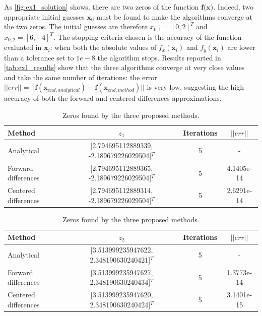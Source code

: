 \documentclass[11pt,a4paper,oneside]{article}
\renewcommand{\vec}[1]{\mathbf{#1}}
\begin{document}
As \autoref{fig:ex1_solution} shows, there are two zeros of the function $\vec{f}$($\vec{x}$). Indeed, two appropriate initial guesses $\vec{x}_0$ must be found to make the algorithms converge at the two zeros. The initial guesses are therefore $x_{0,1}=[0, 2]^T$ and $x_{0,2}=[6, -4]^T$. The stopping criteria chosen is the accuracy of the function evaluated in $\vec{x}_i$: when both the absolute values of $f_x(\vec{x}_i)$ and $f_y(\vec{x}_i)$ are lower than a tolerance set to $1e-8$ the algorithm stops.
Results reported in \autoref{tab:ex1_results} show that the three algorithms converge at very close values and take the same number of iterations: the error $||err||=||\vec{f}(\vec{x}_{end,analytical}) - \vec{f}(\vec{x}_{end,method})||$ is very low, suggesting the high accuracy of both the forward and centered differences approximations.
\begin{table}[ht]
    \centering
    \begin{tabular}{l|c c c}
        \textbf{Method} & \mbox{\boldmath $z_1$} & \textbf{Iterations} &  \mbox{\boldmath $||err||$} \\
        \midrule
        \midrule
        Analytical                  & [2.794695112889339, -2.189679226029504]$^T$  & 5 & -\\
        Forward differences         & [2.794695112889365, -2.189679226029504]$^T$  & 5 & 4.1405e-14\\
        Centered differences        & [2.794695112889314, -2.189679226029504]$^T$  & 5 & 2.6291e-14\\
        \toprule
    \end{tabular}
    \begin{tabular}{l|c c c}
        \textbf{Method} & \mbox{\boldmath $z_2$} & \textbf{Iterations} &  \mbox{\boldmath $||err||$} \\
        \midrule
        \midrule
        Analytical                  & [3.513999235947622, 2.348190630240421]$^T$  & 5 & -\\
        Forward differences         & [3.513999235947627, 2.348190630240434]$^T$  & 5 & 1.3773e-14\\
        Centered differences        & [3.513999235947620, 2.348190630240424]$^T$  & 5 & 3.1401e-15\\
    \end{tabular}
    \caption{Zeros found by the three proposed methods.}
    \label{tab:ex1_results}
\end{table}

\end{document}
